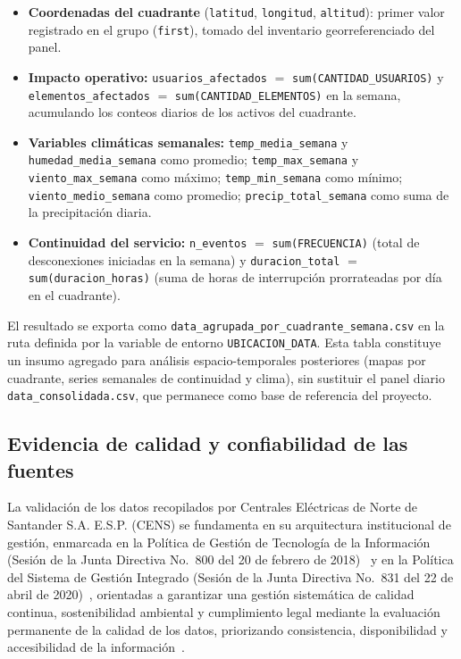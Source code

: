 \begin{itemize}
    \item \textbf{Coordenadas del cuadrante} (\texttt{latitud}, \texttt{longitud}, \texttt{altitud}): primer valor registrado en el grupo (\texttt{first}), tomado del inventario georreferenciado del panel.
    \item \textbf{Impacto operativo:} \texttt{usuarios\_afectados} $=$ \texttt{sum(CANTIDAD\_USUARIOS)} y \texttt{elementos\_afectados} $=$ \texttt{sum(CANTIDAD\_ELEMENTOS)} en la semana, acumulando los conteos diarios de los activos del cuadrante.
    \item \textbf{Variables climáticas semanales:} \texttt{temp\_media\_semana} y \texttt{humedad\_media\_semana} como promedio; \texttt{temp\_max\_semana} y \texttt{viento\_max\_semana} como máximo; \texttt{temp\_min\_semana} como mínimo; \texttt{viento\_medio\_semana} como promedio; \texttt{precip\_total\_semana} como suma de la precipitación diaria.
    \item \textbf{Continuidad del servicio:} \texttt{n\_eventos} $=$ \texttt{sum(FRECUENCIA)} (total de desconexiones iniciadas en la semana) y \texttt{duracion\_total} $=$ \texttt{sum(duracion\_horas)} (suma de horas de interrupción prorrateadas por día en el cuadrante).
\end{itemize}

El resultado se exporta como \texttt{data\_agrupada\_por\_cuadrante\_semana.csv} en la ruta definida por la variable de entorno \texttt{UBICACION\_DATA}. Esta tabla constituye un insumo agregado para análisis espacio-temporales posteriores (mapas por cuadrante, series semanales de continuidad y clima), sin sustituir el panel diario \texttt{data\_consolidada.csv}, que permanece como base de referencia del proyecto.

\subsection{Evidencia de calidad y confiabilidad de las fuentes}
\label{sec:evidencia_calidad_fuentes}

La validación de los datos recopilados por Centrales Eléctricas de Norte de Santander S.A. E.S.P. (CENS) se fundamenta en su arquitectura institucional de gestión, enmarcada en la Política de Gestión de Tecnología de la Información (Sesión de la Junta Directiva No.~800 del 20 de febrero de 2018)~\cite{ref38} y en la Política del Sistema de Gestión Integrado (Sesión de la Junta Directiva No.~831 del 22 de abril de 2020)~\cite{ref2}, orientadas a garantizar una gestión sistemática de calidad continua, sostenibilidad ambiental y cumplimiento legal mediante la evaluación permanente de la calidad de los datos, priorizando consistencia, disponibilidad y accesibilidad de la información~\cite{ref39}.

